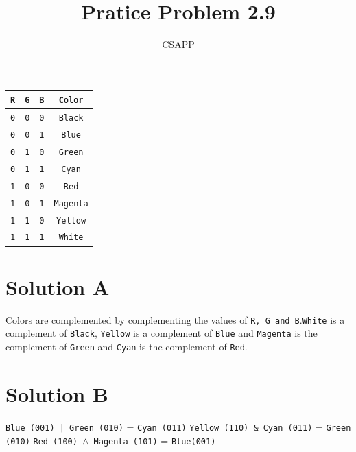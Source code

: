 \documentclass{article}
\title{Pratice Problem 2.9}
\author{CSAPP}
\begin{document}
    \maketitle

    \begin{center}
        \begin{tabular}{cccc}
        \texttt{R}  &   \texttt{G}  &   \texttt{B}  &   \texttt{Color}\\
        \midrule
        \texttt{0}  &   \texttt{0}  &   \texttt{0}  &   \texttt{Black}\\
        \texttt{0}  &   \texttt{0}  &   \texttt{1}  &   \texttt{Blue}\\
        \texttt{0}  &   \texttt{1}  &   \texttt{0}  &   \texttt{Green}\\
        \texttt{0}  &   \texttt{1}  &   \texttt{1}  &   \texttt{Cyan}\\
        \texttt{1}  &   \texttt{0}  &   \texttt{0}  &   \texttt{Red}\\
        \texttt{1}  &   \texttt{0}  &   \texttt{1}  &   \texttt{Magenta}\\
        \texttt{1}  &   \texttt{1}  &   \texttt{0}  &   \texttt{Yellow}\\
        \texttt{1}  &   \texttt{1}  &   \texttt{1}  &   \texttt{White}\\
        \end{tabular}
    \end{center}

    \section*{\small Solution A}
    \begin{flushleft}
        Colors are complemented by complementing the values of 
        \texttt{R, G and B}.\newline \texttt{White} is a complement of \texttt{Black}, 
        \texttt{Yellow} is a complement of \texttt{Blue} and \texttt{Magenta} is the complement of \texttt{Green}
        and \texttt{Cyan} is the complement of \texttt{Red}.
    \end{flushleft}  

    \section*{\small Solution B}
    \texttt{Blue \texttt{(001)} | Green \texttt{(010)}} = \texttt{Cyan \texttt{(011)}}
    \newline\texttt{Yellow \texttt{(110)} \& Cyan \texttt{(011)}} = \texttt{Green \texttt{(010)}}
    \newline\texttt{Red \texttt{(100)} $\land$ Magenta \texttt{(101)}} = \texttt{Blue\texttt{(001)}}
\end{document}
